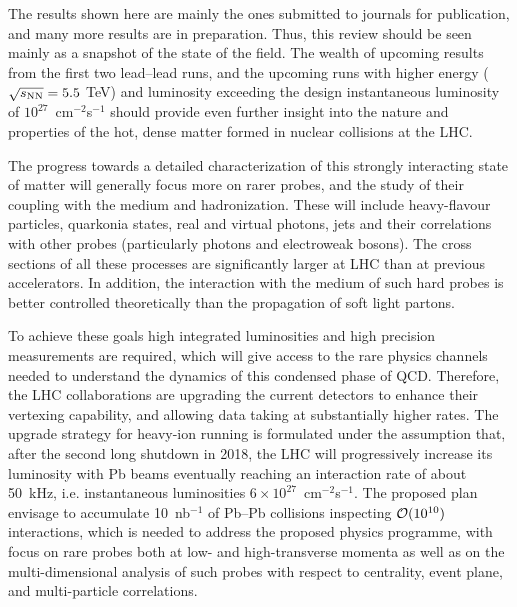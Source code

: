 The results shown here are mainly the ones submitted to journals for publication, and many more
results are in preparation.  Thus, this review should be seen mainly as a snapshot of
the state of the field.  The wealth of upcoming results from the first two lead--lead runs,
and the upcoming runs with higher energy ($\mbox{$\sqrt{s_{\mathrm{NN}}}$} = 5.5$ TeV) and luminosity
exceeding the design instantaneous luminosity of $10^{27}$~cm$^{-2}$s$^{-1}$ should
provide even further insight into
the nature and properties of the hot, dense matter formed in nuclear collisions at the LHC.

The progress towards a detailed characterization of this strongly
interacting state of matter will generally focus more on rarer probes,
and the study of their coupling with the medium and
hadronization. These will include heavy-flavour particles, quarkonia
states, real and virtual photons, jets and their correlations with
other probes (particularly photons and electroweak bosons).  The cross
sections of all these processes are significantly larger at LHC than
at previous accelerators. In addition, the interaction with the medium
of such hard probes is better controlled theoretically than the
propagation of soft light partons.

To achieve these goals high integrated luminosities and high precision measurements
are required, which will give access to the rare physics channels
needed to understand the dynamics of this condensed phase of QCD.
Therefore, the LHC collaborations are upgrading the current
detectors to enhance their vertexing capability, and allowing data
taking at substantially higher rates.  The upgrade strategy for
heavy-ion running is formulated under the assumption that, after the
second long shutdown in 2018, the LHC will progressively increase its
luminosity with Pb beams eventually reaching an interaction rate of
about 50~kHz, i.e. instantaneous luminosities $6 \times
10^{27}$~cm$^{-2}$s$^{-1}$. The proposed plan~\cite{ALICEUpgradeLoI}
envisage to accumulate 10~nb$^{-1}$ of Pb--Pb collisions inspecting
${\cal O}(10^{10})$ interactions, which is needed to address the
proposed physics programme, with focus on rare probes both at low- and
high-transverse momenta as well as on the multi-dimensional analysis
of such probes with respect to centrality, event plane, and
multi-particle correlations.
